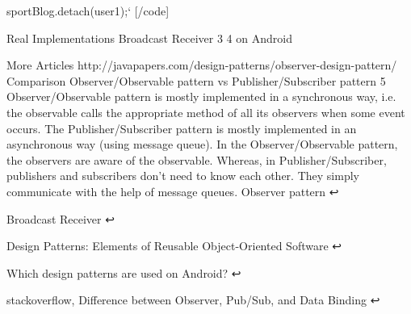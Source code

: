 sportBlog.detach(user1);` [/code]

Real Implementations
Broadcast Receiver 3 4 on Android

More Articles
http://javapapers.com/design-patterns/observer-design-pattern/
Comparison
Observer/Observable pattern vs Publisher/Subscriber pattern 5
Observer/Observable pattern is mostly implemented in a synchronous way, i.e. the observable calls the appropriate method of all its observers when some event occurs. The Publisher/Subscriber pattern is mostly implemented in an asynchronous way (using message queue).
In the Observer/Observable pattern, the observers are aware of the observable. Whereas, in Publisher/Subscriber, publishers and subscribers don't need to know each other. They simply communicate with the help of message queues.
Observer pattern ↩

Broadcast Receiver ↩

Design Patterns: Elements of Reusable Object-Oriented Software ↩

Which design patterns are used on Android? ↩

stackoverflow, Difference between Observer, Pub/Sub, and Data Binding ↩


